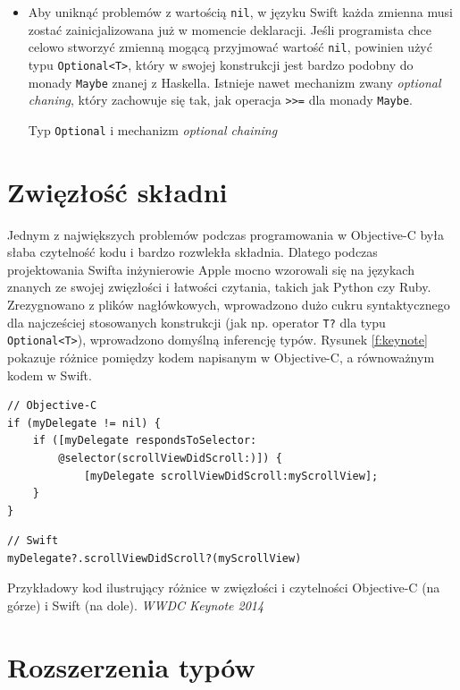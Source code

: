 \documentclass[mgr, shortabstract]{iithesis}
\newcommand{\swiftlisting}[2]{
    \swiftcode{src/#1.swift}
    \begin{listing}[ht]
      \caption{#2}
      \label{l:#1}
    \end{listing}
}
\begin{document}
\begin{itemize}
    \item Aby uniknąć problemów z wartością \texttt{nil}, w języku Swift każda zmienna musi zostać zainicjalizowana już w momencie deklaracji. Jeśli programista chce celowo stworzyć zmienną mogącą przyjmować wartość \texttt{nil}, powinien użyć typu \texttt{Optional<T>}, który w swojej konstrukcji jest bardzo podobny do monady \texttt{Maybe} znanej z Haskella. Istnieje nawet mechanizm zwany \textit{optional chaning}, który zachowuje się tak, jak operacja \texttt{>>=} dla monady \texttt{Maybe}.

    \swiftlisting
        {2_optional}
        {Typ \texttt{Optional} i mechanizm \textit{optional chaining}}

\end{itemize}

\section{Zwięzłość składni}
\label{s:zwiezlosc_skladni}

Jednym z największych problemów podczas programowania w Objective-C była słaba czytelność kodu i bardzo rozwlekła składnia. Dlatego podczas projektowania Swifta inżynierowie Apple mocno wzorowali się na językach znanych ze swojej zwięzłości i łatwości czytania, takich jak Python czy Ruby. Zrezygnowano z plików nagłówkowych, wprowadzono dużo cukru syntaktycznego dla najcześciej stosowanych konstrukcji (jak np. operator \texttt{T?} dla typu \texttt{Optional<T>}), wprowadzono domyślną inferencję typów. Rysunek \ref{f:keynote} pokazuje różnice pomiędzy kodem napisanym w Objective-C, a równoważnym kodem w Swift.

\begin{listing}[ht]
\begin{verbatim}
// Objective-C
if (myDelegate != nil) {
    if ([myDelegate respondsToSelector:
        @selector(scrollViewDidScroll:)]) {
            [myDelegate scrollViewDidScroll:myScrollView];
    }
}
\end{verbatim}

\begin{verbatim}
// Swift
myDelegate?.scrollViewDidScroll?(myScrollView)
\end{verbatim}
\caption{Przykładowy kod ilustrujący różnice w zwięzłości i czytelności Objective-C (na górze) i Swift (na dole). \textit{WWDC Keynote 2014}}
\label{f:keynote}
\end{listing}

\section{Rozszerzenia typów}
\label{s:rozszerzenia_typow}
\end{document}
